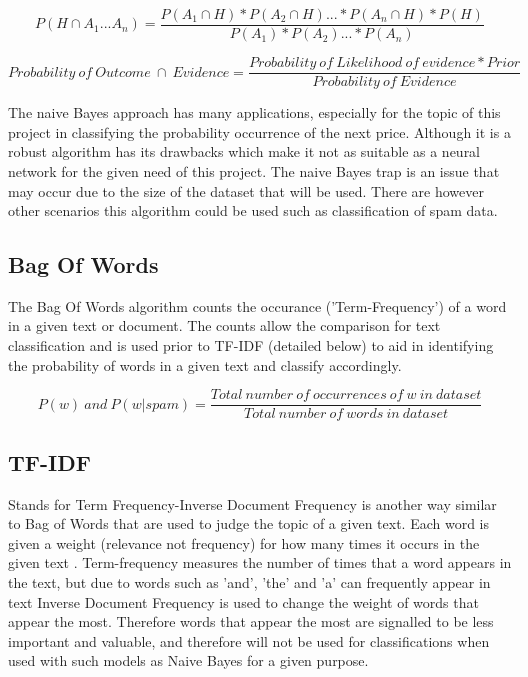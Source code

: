 \documentclass[oneside, 12pt]{article}
\begin{document}
			\[P(H\cap A_1 ... A_n) = \frac{P(A_1\cap H) * P(A_2\cap H) ... * P(A_n\cap H) * P(H)}{P(A_1) * P(A_2) ... * P(A_n)} \]
			
			\[Probability \ of \ Outcome\ \cap \ Evidence = \frac{Probability \ of \ Likelihood \ of \ evidence * Prior}{Probability \ of \ Evidence} \]
			
			The naive Bayes approach has many applications, especially for the topic of this project in classifying the probability occurrence of the next price. Although it is a robust algorithm has its drawbacks which make it not as suitable as a neural network for the given need of this project. The naive Bayes trap is an issue that may occur due to the size of the dataset that will be used. There are however other scenarios this algorithm could be used such as classification of spam data.\cite{StudyNBC}
			
			\subsection{Bag Of Words}
			The Bag Of Words algorithm counts the occurance ('Term-Frequency') of a word in a given text or document. The counts allow the comparison for text classification and is used prior to TF-IDF (detailed below) to aid in identifying the probability of words in a given text and classify accordingly. \cite{TFIDFBOW}
			
			\[P(w) \ and\ P(w|spam) = \frac{Total\ number\ of\ occurrences\ of\ w\ in\ dataset}{Total\ number\ of\ words\ in\ dataset}\]
			
			\subsection{TF-IDF}
			Stands for Term Frequency-Inverse Document Frequency is another way similar to Bag of Words that are used to judge the topic of a given text. Each word is given a weight (relevance not frequency) for how many times it occurs in the given text \cite{TFIDFBOW}. 
			Term-frequency measures the number of times that a word appears in the text, but due to words such as 'and', 'the' and 'a' can frequently appear in text Inverse Document Frequency is used to change the weight of words that appear the most. Therefore words that appear the most are signalled to be less important and valuable, and therefore will not be used for classifications when used with such models as Naive Bayes for a given purpose. \cite{TFIDFBOW}
			\newline
			
\end{document}
